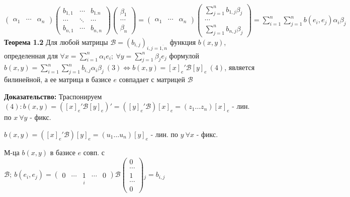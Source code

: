 $\begin{pmatrix}\alpha_1 & \cdots & \alpha_n \end{pmatrix} \begin{pmatrix} b_{1,1} & \cdots & b_{1.n} \\ \cdots & \ddots & \cdots \\ b_{n,1} & \cdots & b_{n,n} \end{pmatrix} \begin{pmatrix} \beta_1 \\ \cdots \\ \beta_n \end{pmatrix} =
\begin{pmatrix}\alpha_1 & \cdots & \alpha_n \end{pmatrix}
\begin{pmatrix}
 \sum\limits_{j=1}^n b_{1,j} \beta_j \\
 \cdots \\
 \sum\limits_{j=1}^n b_{n,j} \beta_j
\end{pmatrix} = \sum\limits_{i=1}^n \sum\limits_{j=1}^n b(e_i, e_j) \alpha_i \beta_j
$\\

\textbf{Теорема 1.2} Для любой матрицы $\mathcal{B} = (b_{i,j})_{i,j=\overline{1,n}} $ функция $b(x,y)$, определенная для $\forall x = \sum\limits_{i=1}^n \alpha_i e_i;\ \forall y = \sum\limits_{j=1}^n \beta_j e_j$ формулой
$b(x,y) = \sum\limits_{i=1}^n \sum\limits_{j=1}^n b_{i,j} \alpha_i \beta_j\ (3) \Leftrightarrow b(x,y) = [x]_e' \mathcal{B} [y]_e\ (4)$, является билинейной, а ее матрица в базисе $e$ совпадает с матрицей $\mathcal{B}$

\textbf{Доказательство: } Траспонируем $(4): b(x,y) = \left( [x]_e' \mathcal{B} [y]_e \right)' = \left( [y]_e' \mathcal{B} \right)[x]_e = (z_1\ldots z_n)[x]_e$ - лин. по $x\ \forall y$ - фикс.

$b(x,y) = \left( [x]_e' \mathcal{B} \right)[y]_e = (u_1\ldots u_n) [y]_e$ - лин. по $y\ \forall x$ - фикс.

М-ца $b(x,y)$ в базисе $e$ совп. с $\mathcal{B};\ b(e_i, e_j) = \underset{i} {\begin{pmatrix} 0 & \cdots & 1 & \cdots & 0 \end{pmatrix}} \mathcal{B} \begin{pmatrix} 0 \\ \cdots \\ 1 \\ \cdots \\ 0 \end{pmatrix}{}_j = b_{i,j}$

